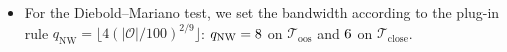 \begin{itemize}
  \begin{itemize}
  \item For the Diebold--Mariano test, we set the bandwidth according to the plug-in rule $q_{\mathrm{NW}} = \lfloor 4 (|\mathcal O|/100)^{2/9} \rfloor$: $q_{\mathrm{NW}} = 8$ on $\mathcal T_{\mathrm{oos}}$ and $6$ on $\mathcal T_{\mathrm{close}}$.
  \end{itemize}

\end{itemize}
